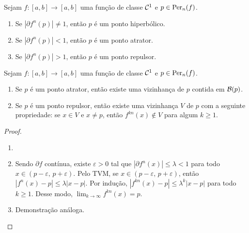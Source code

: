 \begin{definition}
Sejam $f: [a, b] \to [a, b]$ uma função de classe $\mathcal{C}^1$ e $p \in \operatorname{Per}_n(f)$.
\begin{enumerate}[label = \alph*.]
\item Se $|\partial f^n(p)| \neq 1$, então $p$ é um ponto hiperbólico.
\item Se $|\partial f^n(p)| < 1$, então $p$ é um ponto atrator.
\item Se $|\partial f^n(p)| > 1$, então $p$ é um ponto repulsor.
\end{enumerate}
\end{definition}

\begin{theorem}
Sejam $f: [a, b] \to [a, b]$ uma função de classe $\mathcal{C}^1$ e $p \in \operatorname{Per}_n(f)$.
\begin{enumerate}
\item Se $p$ é um ponto atrator, então existe uma vizinhança de $p$ contida em $\mathcal{B}(p)$.
\item Se $p$ é um ponto repulsor, então existe uma vizinhança $V$ de $p$ com a seguinte propriedade: se $x \in V$ e $x \neq p$, então  $f^{kn}(x) \notin V$ para algum $k \geq 1$. 
\end{enumerate}
\end{theorem}

\begin{proof}
\begin{enumerate}
\item[]
\item Sendo $\partial f$ contínua, existe $\varepsilon > 0$ tal que $|\partial f^n(x)| \leq \lambda < 1$ para todo $x \in (p - \varepsilon,\, p + \varepsilon)$. Pelo TVM, se $x \in (p - \varepsilon,\, p + \varepsilon)$, então $|f^n(x) - p| \leq \lambda|x - p|$. Por indução, $|f^{kn}(x) - p| \leq \lambda^k|x - p|$ para todo $k \geq 1$. Desse modo, $\lim_{k \to \infty} f^{kn}(x) = p$.
\item Demonstração análoga.
\end{enumerate}
\end{proof}
